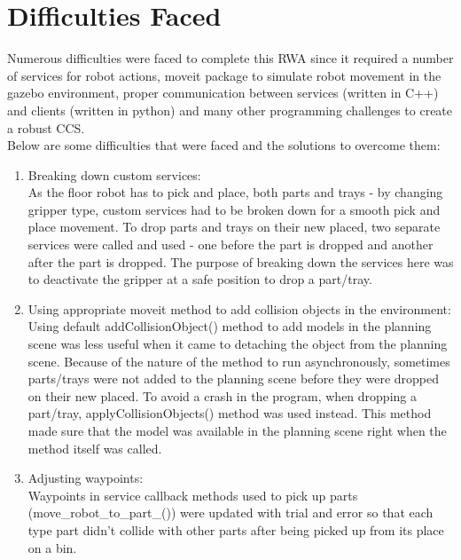 \documentclass{uva-inf-article}
\begin{document}
\section{Difficulties Faced}
Numerous difficulties were faced to complete this RWA since it required a number of services for robot actions, moveit package to simulate robot movement in the gazebo environment, proper communication between services (written in C++) and clients (written in python) and many other programming challenges to create a robust CCS.\\ 
\noindent Below are some difficulties that were faced and the solutions to overcome them:\\
\begin{enumerate}
    \item Breaking down custom services:\\
    As the floor robot has to pick and place, both parts and trays - by changing gripper type, custom services had to be broken down for a smooth pick and place movement. To drop parts and trays on their new placed, two separate services were called and used - one before the part is dropped and another after the part is dropped. The purpose of breaking down the services here was to deactivate the gripper at a safe position to drop a part/tray.  

    \item Using appropriate moveit method to add collision objects in the environment:\\
    Using default addCollisionObject() method to add models in the planning scene was less useful when it came to detaching the object from the planning scene. Because of the nature of the method to run asynchronously, sometimes parts/trays were not added to the planning scene before they were dropped on their new placed. To avoid a crash in the program, when dropping a part/tray, applyCollisionObjects() method was used instead. This method made sure that the model was available in the planning scene right when the method itself was called.
    
    \item Adjusting waypoints:\\ 
    Waypoints in service callback methods used to pick up parts (move\_robot\_to\_part\_()) were updated with trial and error so that each type part didn't collide with other parts after being picked up from its place on a bin.  
\end{enumerate}

\justifying
\end{document}
